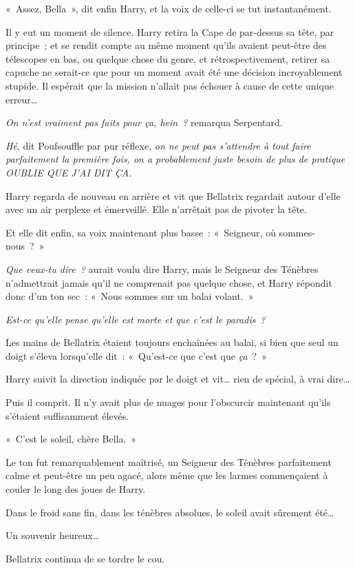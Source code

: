 «~Assez, Bella~», dit enfin Harry, et la voix de celle-ci se tut instantanément.

Il y eut un moment de silence.
Harry retira la Cape de par-dessus sa tête, par principe~; et se rendit compte au même moment qu'ils avaient peut-être des télescopes en bas, ou quelque chose du genre, et rétrospectivement, retirer sa capuche ne serait-ce que pour un moment avait été une décision incroyablement stupide.
Il espérait que la mission n'allait pas échouer à cause de cette unique erreur…

\emph{On n'est vraiment pas faits pour ça, hein~?} remarqua Serpentard.

\emph{Hé}, dit Poufsouffle par pur réflexe, \emph{on ne peut pas s'attendre à tout faire parfaitement la première fois, on a probablement juste besoin de plus de pratique OUBLIE QUE J'AI DIT ÇA.}

Harry regarda de nouveau en arrière et vit que Bellatrix regardait autour d'elle avec un air perplexe et émerveillé.
Elle n'arrêtait pas de pivoter la tête.

Et elle dit enfin, sa voix maintenant plus basse~: «~Seigneur, où sommes-nous~?~»

\emph{Que veux-tu dire~?} aurait voulu dire Harry, mais le Seigneur des Ténèbres n'admettrait jamais qu'il ne comprenait pas quelque chose, et Harry répondit donc d'un ton sec~: «~Nous sommes sur un balai volant.~»

\emph{Est-ce qu'elle pense qu'elle est morte et que c'est le paradis~?}

Les mains de Bellatrix étaient toujours enchaînées au balai, si bien que seul un doigt s'éleva lorsqu'elle dit~: «~Qu'est-ce que c'est que \emph{ça}~?~»

Harry suivit la direction indiquée par le doigt et vit… rien de spécial, à vrai dire…

Puis il comprit.
Il n'y avait plus de nuages pour l'obscurcir maintenant qu'ils s'étaient suffisamment élevés.

«~C'est le soleil, chère Bella.~»

Le ton fut remarquablement maîtrisé, un Seigneur des Ténèbres parfaitement calme et peut-être un peu agacé, alors même que les larmes commençaient à couler le long des joues de Harry.

Dans le froid sans fin, dans les ténèbres absolues, le soleil avait sûrement été…

Un souvenir heureux…

Bellatrix continua de se tordre le cou.


